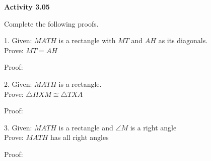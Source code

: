 \vspace{0.3ex}
\noindent\textbf{Activity 3.05}

\vspace{0.2ex}

Complete the following proofs.

\begin{minipage}[c]{0.35\textwidth}
1. Given:  \(MATH\) is a rectangle with \(MT\) and \(AH\) as its diagonals.\\
Prove: \(MT = AH\)

\end{minipage}
\begin{minipage}[c]{0.14\textwidth}

\end{minipage}

\nextcolumn
Proof: 
\vspace*{-0.5em}
\begin{center}

\noindent\begin{minipage}{30em}
  
\end{minipage}
\end{center}

\begin{minipage}[c]{0.35\textwidth}
2. Given:  \(MATH\) is a rectangle.\\
Prove: \(\bigtriangleup HXM \cong \bigtriangleup TXA\)

\end{minipage}
\begin{minipage}[c]{0.14\textwidth}

\end{minipage}

Proof: 
\vspace*{-0.5em}
\begin{center}

\noindent\begin{minipage}{30em}
  
\end{minipage}

\end{center}

\begin{minipage}[c]{0.35\textwidth}
3. Given:  \(MATH\) is a rectangle and \(\angle M\) is a right angle\\
Prove: \(MATH\) has all right angles

\end{minipage}
\begin{minipage}[c]{0.14\textwidth}

\end{minipage}

Proof: 
\vspace*{-0.5em}
\begin{center}

\noindent\begin{minipage}{30em}
  
\end{minipage}

\end{center} 
 
